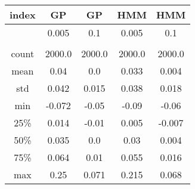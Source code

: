 \centering \begin{tabular}{c|c|c|c|c}
index	&GP	&GP	&HMM	&HMM\\\hline
	&0.005	&0.1	&0.005	&0.1\\
	&	&	&	&\\
count	&2000.0	&2000.0	&2000.0	&2000.0\\
mean	&0.04	&0.0	&0.033	&0.004\\
std	&0.042	&0.015	&0.038	&0.018\\
min	&-0.072	&-0.05	&-0.09	&-0.06\\
25\%	&0.014	&-0.01	&0.005	&-0.007\\
50\%	&0.035	&0.0	&0.03	&0.004\\
75\%	&0.064	&0.01	&0.055	&0.016\\
max	&0.25	&0.071	&0.215	&0.068\\
\end{tabular}
